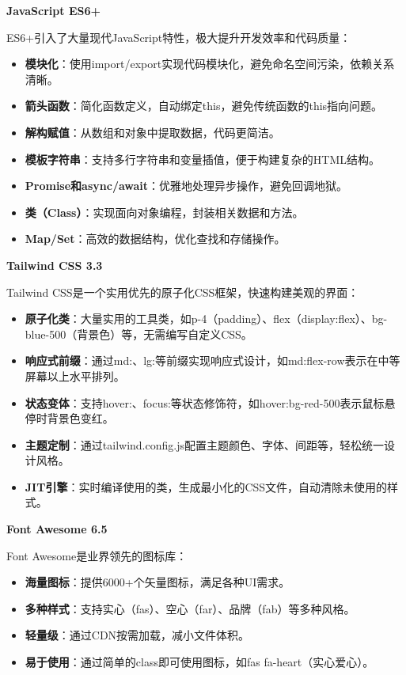 \documentclass[12pt,a4paper]{article}
\begin{document}
\textbf{JavaScript ES6+}

ES6+引入了大量现代JavaScript特性，极大提升开发效率和代码质量：

\begin{itemize}
    \item \textbf{模块化}：使用import/export实现代码模块化，避免命名空间污染，依赖关系清晰。
    \item \textbf{箭头函数}：简化函数定义，自动绑定this，避免传统函数的this指向问题。
    \item \textbf{解构赋值}：从数组和对象中提取数据，代码更简洁。
    \item \textbf{模板字符串}：支持多行字符串和变量插值，便于构建复杂的HTML结构。
    \item \textbf{Promise和async/await}：优雅地处理异步操作，避免回调地狱。
    \item \textbf{类（Class）}：实现面向对象编程，封装相关数据和方法。
    \item \textbf{Map/Set}：高效的数据结构，优化查找和存储操作。
\end{itemize}

\textbf{Tailwind CSS 3.3}

Tailwind CSS是一个实用优先的原子化CSS框架，快速构建美观的界面：

\begin{itemize}
    \item \textbf{原子化类}：大量实用的工具类，如p-4（padding）、flex（display:flex）、bg-blue-500（背景色）等，无需编写自定义CSS。
    \item \textbf{响应式前缀}：通过md:、lg:等前缀实现响应式设计，如md:flex-row表示在中等屏幕以上水平排列。
    \item \textbf{状态变体}：支持hover:、focus:等状态修饰符，如hover:bg-red-500表示鼠标悬停时背景色变红。
    \item \textbf{主题定制}：通过tailwind.config.js配置主题颜色、字体、间距等，轻松统一设计风格。
    \item \textbf{JIT引擎}：实时编译使用的类，生成最小化的CSS文件，自动清除未使用的样式。
\end{itemize}

\textbf{Font Awesome 6.5}

Font Awesome是业界领先的图标库：

\begin{itemize}
    \item \textbf{海量图标}：提供6000+个矢量图标，满足各种UI需求。
    \item \textbf{多种样式}：支持实心（fas）、空心（far）、品牌（fab）等多种风格。
    \item \textbf{轻量级}：通过CDN按需加载，减小文件体积。
    \item \textbf{易于使用}：通过简单的class即可使用图标，如fas fa-heart（实心爱心）。
\end{itemize}
\end{document}
